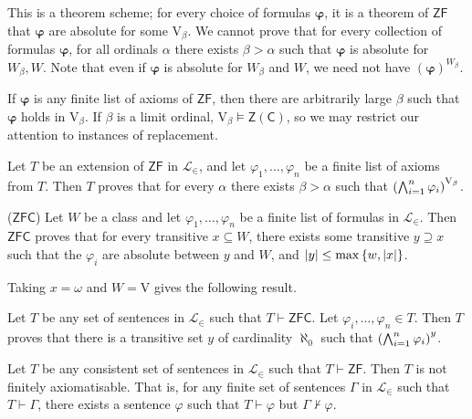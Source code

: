 \begin{remark}
    This is a theorem scheme; for every choice of formulas \( \bm\varphi \), it is a theorem of \( \mathsf{ZF} \) that \( \bm\varphi \) are absolute for some \( \mathrm{V}_\beta \).
    We cannot prove that for every collection of formulas \( \bm\varphi \), for all ordinals \( \alpha \) there exists \( \beta > \alpha \) such that \( \bm\varphi \) is absolute for \( W_\beta, W \).
    Note that even if \( \bm\varphi \) is absolute for \( W_\beta \) and \( W \), we need not have \( (\bm\varphi)^{W_\beta} \).

    If \( \bm\varphi \) is any finite list of axioms of \( \mathsf{ZF} \), then there are arbitrarily large \( \beta \) such that \( \bm\varphi \) holds in \( \mathrm{V}_\beta \).
    If \( \beta \) is a limit ordinal, \( \mathrm{V}_\beta \vDash \mathsf{Z}(\mathsf{C}) \), so we may restrict our attention to instances of replacement.
\end{remark}
\begin{corollary}
    Let \( T \) be an extension of \( \mathsf{ZF} \) in \( \mathcal L_\in \), and let \( \varphi_1, \dots, \varphi_n \) be a finite list of axioms from \( T \).
    Then \( T \) proves that for every \( \alpha \) there exists \( \beta > \alpha \) such that \( \qty(\bigwedge_{i=1}^n \varphi_i)^{\mathrm{V}_\beta} \).
\end{corollary}
\begin{corollary}
    (\( \mathsf{ZFC} \))
    Let \( W \) be a class and let \( \varphi_1, \dots, \varphi_n \) be a finite list of formulas in \( \mathcal L_\in \).
    Then \( \mathsf{ZFC} \) proves that for every transitive \( x \subseteq W \), there exists some transitive \( y \supseteq x \) such that the \( \varphi_i \) are absolute between \( y \) and \( W \), and \( \abs{y} \leq \max\qty{w, \abs{x}} \).
\end{corollary}
Taking \( x = \omega \) and \( W = \mathrm{V} \) gives the following result.
\begin{corollary}
    Let \( T \) be any set of sentences in \( \mathcal L_\in \) such that \( T \vdash \mathsf{ZFC} \).
    Let \( \varphi_i, \dots, \varphi_n \in T \).
    Then \( T \) proves that there is a transitive set \( y \) of cardinality \( \aleph_0 \) such that \( \qty(\bigwedge_{i=1}^n \varphi_i)^y \).
\end{corollary}
\begin{corollary}
    Let \( T \) be any consistent set of sentences in \( \mathcal L_\in \) such that \( T \vdash \mathsf{ZF} \).
    Then \( T \) is not finitely axiomatisable.
    That is, for any finite set of sentences \( \Gamma \) in \( \mathcal L_\in \) such that \( T \vdash \Gamma \), there exists a sentence \( \varphi \) such that \( T \vdash \varphi \) but \( \Gamma \nvdash \varphi \).
\end{corollary}
